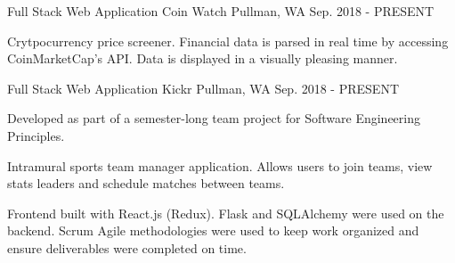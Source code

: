 \begin{cventries}
  \cventry
    {Full Stack Web Application}
    {Coin Watch}
    {Pullman, WA}
    {Sep. 2018 - PRESENT}
    {
      \begin{cvitems}
        \item {Crytpocurrency price screener. Financial data is parsed in real time by accessing CoinMarketCap’s API. Data is displayed in a visually pleasing manner.}
      \end{cvitems}
    }
  \cventry
    {Full Stack Web Application}
    {Kickr}
    {Pullman, WA}
    {Sep. 2018 - PRESENT}
    {
      \begin{cvitems}
        \item {Developed as part of a semester-long team project for Software Engineering Principles.} 
        \item {Intramural sports team manager application. Allows users to join teams, view stats leaders and schedule matches between teams.}
        \item {Frontend built with React.js (Redux). Flask and SQLAlchemy were used on the backend. Scrum Agile methodologies were used to keep work organized and ensure deliverables were completed on time.}
      \end{cvitems}
    }
    
\end{cventries}
